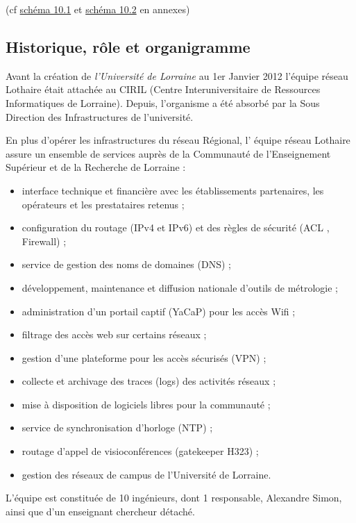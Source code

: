 \documentclass[a4paper,12pt,one side,titlepage]{report}
\begin{document}
(cf \hyperref[fig:imagereseaulothaire1]{schéma 10.1}  et \hyperref[fig:imagereseaulothaire1]{schéma 10.2} 
en annexes)

\subsection{Historique, rôle et organigramme}

Avant la création de \emph{l'Université de Lorraine} au 1er Janvier 2012 l'équipe 
réseau Lothaire était attachée au CIRIL (Centre Interuniversitaire de Ressources Informatiques
de Lorraine). Depuis, l'organisme a été absorbé par la Sous Direction des Infrastructures
de l'université.

En plus d’opérer les infrastructures du réseau Régional, l’ équipe réseau Lothaire 
assure un ensemble de services auprès de la Communauté de l’Enseignement Supérieur 
et de la Recherche de Lorraine :

\begin{itemize}
    \item interface technique et financière avec les établissements partenaires, 
    les opérateurs et les prestataires retenus ;
    \item configuration du routage (IPv4 et IPv6) et des règles de sécurité (ACL , 
    Firewall) ;
    \item service de gestion des noms de domaines (DNS) ;
    \item développement, maintenance et diffusion nationale d’outils de métrologie  ;
    \item administration d’un portail captif (YaCaP) pour les accès Wifi ;
    \item filtrage des accès web sur certains réseaux ;
    \item gestion d’une plateforme pour les accès sécurisés (VPN) ;
    \item collecte et archivage des traces (logs) des activités réseaux ;
    \item mise à disposition de logiciels libres pour la communauté ;
    \item service de synchronisation d’horloge (NTP) ;
    \item routage d’appel de visioconférences (gatekeeper H323) ;
    \item gestion des réseaux de campus de l’Université de Lorraine.
\end{itemize}                                                

L'équipe est constituée de 10 ingénieurs, dont 1 responsable, Alexandre Simon, ainsi
que d'un enseignant chercheur détaché.
\end{document}
